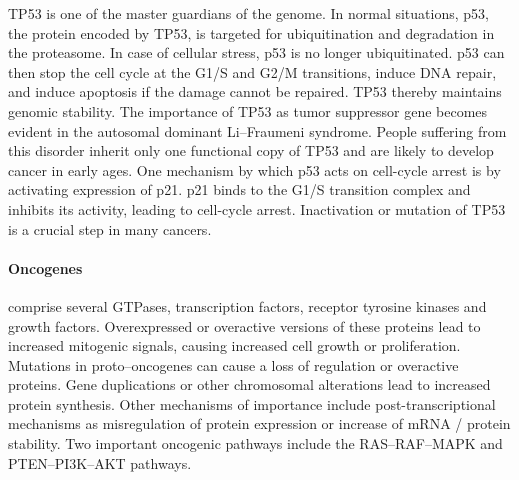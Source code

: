 {{{      TP53 is one of the master guardians of the genome. In normal situations,
    p53, the protein encoded by TP53, is targeted for ubiquitination and
    degradation in the proteasome. In case of cellular stress, p53 is no longer
    ubiquitinated. p53 can then stop the cell cycle at the G1/S and G2/M
    transitions, induce DNA repair, and induce apoptosis if the damage cannot be
    repaired. TP53 thereby maintains genomic stability. The importance of TP53
    as tumor suppressor gene becomes evident in the autosomal dominant
    Li--Fraumeni syndrome. People suffering from this disorder inherit only one
    functional copy of TP53 and are likely to develop cancer in early ages. One
    mechanism by which p53 acts on cell-cycle arrest is by activating expression
    of p21. p21 binds to the G1/S transition complex and inhibits its activity,
    leading to cell-cycle arrest. Inactivation or mutation of TP53 is a crucial
    step in many cancers.

      \paragraph{Oncogenes} comprise several GTPases, transcription factors,
      receptor tyrosine kinases and growth factors. Overexpressed or overactive
      versions of these proteins lead to increased mitogenic signals,
      causing increased cell growth or proliferation. Mutations in
      proto--oncogenes can cause a loss of regulation or overactive proteins.
      Gene duplications or other chromosomal alterations lead to increased
      protein synthesis. Other mechanisms of importance include
      post-transcriptional mechanisms as misregulation of protein expression or
      increase of mRNA / protein stability. Two important oncogenic pathways
      include the RAS--RAF--MAPK and PTEN--PI3K--AKT pathways.

}}}
